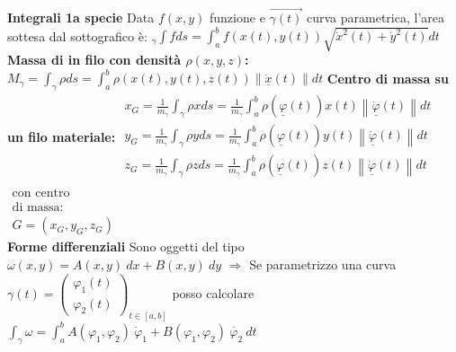 \documentclass[a4paper, oneside]{article}
\newcommand{\tab}{\hspace*{2em}}
\begin{document}
\textbf{Integrali 1a specie} Data $f(x,y)$ funzione e $\vec{\gamma (t)}$ curva parametrica, l'area sottesa dal sottografico è: $\displaystyle _{\gamma}\int fds=\int_a^bf\left(x(t),y(t)\right)\sqrt{\dot{x}^2(t)+\dot{y}^2(t)}dt$
    \\
    \textbf{Massa di in filo con densità $\rho (x,y,z)$: } $ M_{\gamma} = \int_{\gamma} \rho ds = \int_{a}^{b} \rho(x(t),y(t),z(t)) \left\lVert \underline{\dot{x}}(t)\right\rVert dt$
    \textbf{Centro di massa su un filo materiale: } $\displaystyle \begin{matrix}
    x_G  = \frac{1}{m_\gamma} \int_{\gamma} \rho x ds = \frac{1}{m_\gamma} \int_{a}^{b} \rho(\underline{\varphi}(t)) x(t) \left\lVert \underline{\dot{\varphi}}(t) \right\rVert dt \\
    y_G  = \frac{1}{m_\gamma} \int_{\gamma} \rho y ds = \frac{1}{m_\gamma} \int_{a}^{b} \rho(\underline{\varphi}(t)) y(t) \left\lVert \underline{\dot{\varphi}}(t) \right\rVert dt \\
    z_G  = \frac{1}{m_\gamma} \int_{\gamma} \rho z ds = \frac{1}{m_\gamma} \int_{a}^{b} \rho(\underline{\varphi}(t)) z(t) \left\lVert \underline{\dot{\varphi}}(t) \right\rVert dt \\
    \end{matrix}$ $\begin{matrix}\text{con centro} \\ \text{di massa:} \\ G=(x_G,y_G,z_G)\end{matrix}$\\
\textbf{Forme differenziali}\tab
Sono oggetti del tipo $\omega(x,y) = A(x,y) \ dx + B(x,y) \ dy$ $\Rightarrow$ Se parametrizzo una curva $\gamma (t)=\begin{pmatrix}
    \varphi_1 (t) \\
    \varphi_2 (t)
\end{pmatrix}_{t\in[a,b]}$ posso calcolare $\int_{\gamma} \omega = \int_{a}^{b} A(\varphi_1,\varphi_2) \ \dot{\varphi}_1 + B(\varphi_1,\varphi_2) \ \dot{\varphi_2} \ dt$ \\
\end{document}

